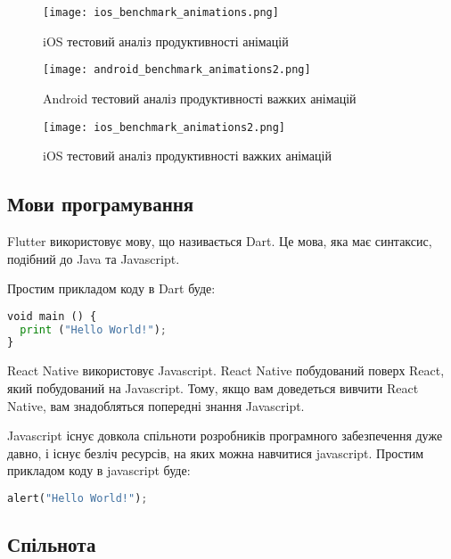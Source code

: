 \begin{figure}
    \texttt{[image: ios\_benchmark\_animations.png]}
    \caption{iOS тестовий аналіз продуктивності анімацій}
    \label{fig:ios_benchmark_animations}
\end{figure}

\begin{figure}
    \texttt{[image: android\_benchmark\_animations2.png]}
    \caption{Android тестовий аналіз продуктивності важких анімацій}
    \label{fig:android_benchmark_animations2}
\end{figure}

\begin{figure}
    \texttt{[image: ios\_benchmark\_animations2.png]}
    \caption{iOS тестовий аналіз продуктивності важких анімацій}
    \label{fig:ios_benchmark_animations2}
\end{figure}

\subsection{Мови програмування}
\label{subsec:languages}

Flutter використовує мову, що називається Dart.
Це мова, яка має синтаксис, подібний до Java та Javascript.

Простим прикладом коду в Dart буде:
\begin{lstlisting}[style=light, language=Python,label={lst:vectorimg},caption=Dart Hello World]
void main () { 
  print ("Hello World!"); 
}
\end{lstlisting}

React Native використовує Javascript.
React Native побудований поверх React, який побудований на Javascript.
Тому, якщо вам доведеться вивчити React Native, вам знадобляться попередні знання Javascript.

Javascript існує довкола спільноти розробників програмного забезпечення дуже давно, і існує безліч ресурсів, на яких можна навчитися javascript.
Простим прикладом коду в javascript буде:

\begin{lstlisting}[style=light, language=Python,label={lst:vectorimg},caption=Dart Hello World]
  alert("Hello World!");
\end{lstlisting}

\subsection{Спільнота}
\label{subsec:communities}


